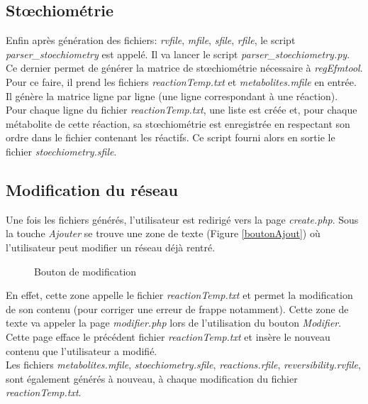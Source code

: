 \subsection{Stœchiométrie}
Enfin après génération des fichiers: \emph{rvfile}, \emph{mfile}, \emph{sfile}, \emph{rfile}, le script \emph{parser\_stoechiometry} est appelé. Il va lancer le script \emph{parser\_stoechiometry.py}. Ce dernier permet de générer la matrice de stœchiométrie nécessaire à \emph{regEfmtool}. Pour ce faire, il prend les fichiers \emph{reactionTemp.txt} et \emph{metabolites.mfile} en entrée. Il génère la matrice ligne par ligne (une ligne correspondant à une réaction). \\
Pour chaque ligne du fichier \emph{reactionTemp.txt}, une liste est créée et, pour chaque métabolite de cette réaction, sa stœchiométrie est enregistrée en respectant son ordre dans le fichier contenant les réactifs. Ce script fourni alors en sortie le fichier \emph{stoechiometry.sfile}.

\subsection{Modification du réseau}
Une fois les fichiers générés, l'utilisateur est redirigé vers la page \emph{create.php}.
Sous la touche \emph{Ajouter} se trouve une zone de texte (Figure \ref{boutonAjout}) où l'utilisateur peut modifier un réseau déjà rentré.

\begin{figure}[!ht]
    \begin{center}
        \caption{Bouton de modification}
          \label{boutonModif}
      \end{center}   
\end{figure}

En effet, cette zone appelle le fichier \emph{reactionTemp.txt} et permet la modification de son contenu (pour corriger une erreur de frappe notamment). Cette zone de texte va appeler la page \emph{modifier.php} lors de l'utilisation du bouton \emph{Modifier}.\\
 Cette page efface le précédent fichier \emph{reactionTemp.txt} et insère le nouveau contenu que l'utilisateur a modifié. \\
 Les fichiers \emph{metabolites.mfile}, \emph{stoechiometry.sfile}, \emph{reactions.rfile}, \emph{reversibility.rvfile}, sont également générés à nouveau, à chaque modification du fichier \emph{reactionTemp.txt}.
 
